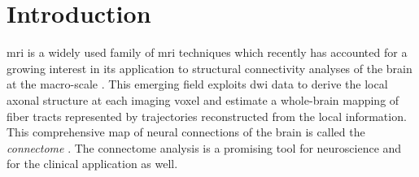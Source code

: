\section{Introduction}
\label{sec:introduction}
% 
% 
% 
% 
%
 \gls{mri} is a widely used family
of \gls{mri} techniques \citep{sundgren_diffusion_2004} which recently 
has accounted for a growing interest in its application to structural 
connectivity analyses of the brain at the macro-scale
\citep{craddock_imaging_2013}. This emerging field exploits
\gls{dwi} data to derive the local axonal structure at each imaging voxel 
\citep{basser_microstructural_2011} and estimate a whole-brain mapping of fiber 
tracts \citep{hagmann_mr_2012,johansen-berg_using_2009} represented by 
trajectories reconstructed from the local information.
This comprehensive map of neural connections of the brain is called the 
\emph{connectome} \citep{hagmann_diffusion_2005,sporns_human_2005}. The connectome
analysis is a promising tool for neuroscience \citep{morgan_why_2013} and 
for the clinical application \citep{griffa_structural_2013} as well.


